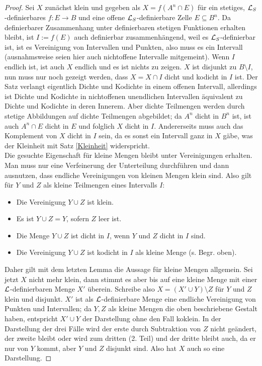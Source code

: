 \begin{proof}
	Sei $X$ zunächst klein und gegeben als $X=f(A^n\cap E)$ für ein stetiges, $\mathcal{L}_S$-definierbares $f:E\rightarrow B$ und eine offene $\mathcal{L}_S$-definierbare Zelle $E\subseteq B^n$. Da definierbarer Zusammenhang unter definierbaren stetigen Funktionen erhalten bleibt, ist $I:=f(E)$ auch definierbar zusammenhängend, weil es $\mathcal{L}_S$-definierbar ist, ist es Vereinigung von Intervallen und Punkten, also muss es ein Intervall (ausnahmsweise seien hier auch nichtoffene Intervalle mitgemeint). Wenn $I$ endlich ist, ist auch $X$ endlich und es ist nichts zu zeigen. $X$ ist disjunkt zu $B\setminus I$, nun muss nur noch gezeigt werden, dass $X=X\cap I$ dicht und kodicht in $I$ ist. Der Satz verlangt eigentlich Dichte und Kodichte in einem offenen Intervall, allerdings ist Dichte und Kodichte in nichtoffenen unendlichen Intervallen äquivalent zu Dichte und Kodichte in deren Innerem. Aber dichte Teilmengen werden durch stetige Abbildungen auf dichte Teilmengen abgebildet; da $A^n$ dicht in $B^n$ ist, ist auch $A^n\cap E$ dicht in $E$ und folglich $X$ dicht in $I$. Andererseits muss auch das Komplement von $X$ dicht in $I$ sein, da es sonst ein Intervall ganz in $X$ gäbe, was der Kleinheit mit Satz \ref{Kleinheit} widerspricht.\\
	Die gesuchte Eigenschaft für kleine Mengen bleibt unter Vereinigungen erhalten. Man muss nur eine Verfeinerung der Unterteilung durchführen und dann ausnutzen, dass endliche Vereinigungen von kleinen Mengen klein sind. Also gilt für $Y$ und $Z$ als kleine Teilmengen eines Intervalls $I$:
	\begin{itemize}
		\item Die Vereinigung $Y\cup Z$ ist klein.
		\item Es ist $Y\cup Z=Y$, sofern $Z$ leer ist.
		\item Die Menge $Y\cup Z$ ist dicht in $I$, wenn $Y$ und $Z$ dicht in $I$ sind.
		\item Die Vereinigung $Y\cup Z$ ist kodicht in $I$ als kleine Menge (s. Begr. oben).
	\end{itemize}
    Daher gilt mit dem letzten Lemma die Aussage für kleine Mengen allgemein.\newpage
	Sei jetzt $X$ nicht mehr klein, dann stimmt es aber bis auf eine kleine Menge mit einer $\mathcal{L}$-definierbaren Menge $X'$ überein. Schreibe also $X=(X'\cup Y)\setminus Z$ für $Y$ und $Z$ klein und disjunkt. $X'$ ist als $\mathcal{L}$-definierbare Menge eine endliche Vereinigung von Punkten und Intervallen; da $Y,Z$  als kleine Mengen die oben beschriebene Gestalt haben, entspricht $X'\cup Y$ der Darstellung ohne den Fall koklein. In der Darstellung der drei Fälle wird der erste durch Subtraktion von $Z$ nicht geändert, der zweite bleibt oder wird zum dritten (2. Teil) und der dritte bleibt auch, da er nur von $Y$ kommt, aber $Y$ und $Z$ disjunkt sind. Also hat $X$ auch so eine Darstellung.
\end{proof}

